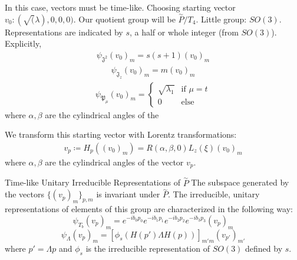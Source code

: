 \documentclass[compress,aspectratio=169,10pt,usenames,dvipsnames]{beamer}
\begin{document}
\begin{frame}
\vfill
In this case, vectors must be time-like.
\vfill
Choosing starting vector $v_0\colon (\sqrt(\lambda),0,0,0)$. Our quotient group will be  $\overset{\sim}{P}/T_4 $. Little group: $SO(3)$.
\vfill
Representations are indicated by $s$, a half or whole integer (from $SO(3)$).  Explicitly,
\begin{equation}
\begin{aligned}
	\psi_{\mathfrak{J}^2} (v_0)_m = s(s+1)(v_0)_m
\end{aligned}
\end{equation}
\begin{equation}
\begin{aligned}
	\psi_{\mathfrak{J}_z} (v_0)_m = m(v_0)_m
\end{aligned}
\end{equation}
\begin{equation}
\begin{aligned}
	\psi_{\mathfrak{P}_\mu} (v_0)_m = \begin{cases}
										\sqrt{\lambda_1} & \text{if } \mu=t\\
										0 & \text{else}
										\end{cases}
\end{aligned}
\end{equation}
where $\alpha,\beta$ are the cylindrical angles of the 
\end{frame}
%
%
\begin{frame}
\vfill
We transform this starting vector with Lorentz transformations:
\begin{equation}
\begin{aligned}
	v_p\coloneq H_p((v_0)_m) = R(\alpha,\beta,0)L_z(\xi)(v_0)_m
\end{aligned}
\end{equation}
where $\alpha,\beta$ are the cylindrical angles of the vector $v_p$.
\vfill
\begin{theorem} Time-like Unitary Irreducible Representations of $\overset{\sim}{P}$
	The subspace generated by the vectors $\{(v_p)_m\}_{p,m}$ is invariant under $\overset{\sim}{P}$. The irreducible, unitary representations of elements of this group are characterized in the following way:
$$\psi_{T_b} (v_p)_m = e^{-ib_0p_0}e^{-ib_1p_1}e^{-ib_2p_2}e^{-ib_3p_3}(v_p)_m$$
$$\psi_\Lambda (v_p)_m = [\phi_s(H(p')\Lambda H(p))]_{m'm} (v_{p'})_{m'}$$
where $p' = \Lambda p$ and $\phi_s$ is the irreducible representation of $SO(3)$ defined by $s$.
\end{theorem}
\end{frame}
\end{document}

